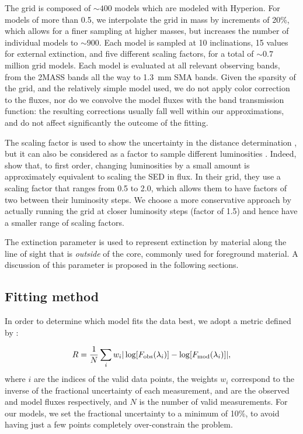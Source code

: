 The grid is composed of $\sim 400$ models which are modeled with Hyperion. For models of more than \SI{0.5}{\Msun}, we interpolate the grid in mass by increments of 20\%, which allows for a finer sampling at higher masses, but increases the number of individual models to $\sim 900$. Each model is sampled at 10 inclinations, 15 values for external extinction, and five different scaling factors, for a total of $\sim 0.7$ million grid models. Each model is evaluated at all relevant observing bands, from the 2MASS bands all the way to \SI{1.3}{\milli\meter} SMA bands. Given the sparsity of the grid, and the relatively simple model used, we do not apply color correction to the fluxes, nor do we convolve the model fluxes with the band transmission function: the resulting corrections usually fall well within our approximations, and do not affect significantly the outcome of the fitting.

The scaling factor is used to show the uncertainty in the distance determination \citep{Robitaille:2006cb}, but it can also be considered as a factor to sample different luminosities \citep{Furlan:2016df}. Indeed, \citet{Furlan:2016df} show that, to first order, changing luminosities by a small amount is approximately equivalent to scaling the SED in flux. In their grid, they use a scaling factor that ranges from 0.5 to 2.0, which allows them to have factors of two between their luminosity steps. We choose a more conservative approach  by actually running the grid at closer luminosity steps (factor of 1.5) and hence have a smaller range of scaling factors. 

The extinction parameter is used to represent extinction by material along the line of sight that is \textit{outside} of the core, commonly used for foreground material. A discussion of this parameter is proposed in the following sections.



\subsection{Fitting method}

In order to determine which model fits the data best, we adopt a metric defined by \citet{Fischer:2012dj}:

\begin{equation}
R = \frac{1}{N}\sum_i w_i|\log[F_\textrm{obs}(\lambda_i)] - \log[F_\textrm{mod}(\lambda_i)]|,
\end{equation}
where $i$ are the indices of the valid data points, the weights $w_i$ correspond to the inverse of the fractional uncertainty of each measurement, \Fobs and \Fmod are the observed and model fluxes respectively, and $N$ is the number of valid measurements. For our models, we set the fractional uncertainty to a minimum of 10\%, to avoid having just a few points completely over-constrain the problem.

